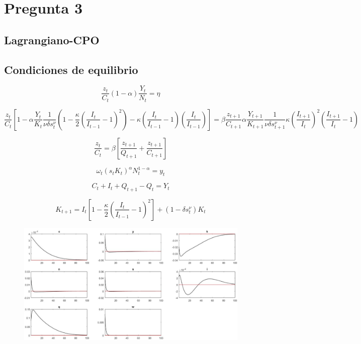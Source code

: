 \documentclass{article}
\begin{document}
\newpage
\section{Pregunta 3}
\subsection{Lagrangiano-CPO}
\subsection{Condiciones de equilibrio}
\begin{equation}
	 {\dfrac{z_t}{C_t}}(1-\alpha){\dfrac{Y_t}{N_t}}=\eta \nonumber
\end{equation}

\begin{equation}
	\dfrac{z_t}{C_t}[1-\alpha{\dfrac{Y_t}{K_t}}{\dfrac{1}{\nu\delta s_t^\nu}}(1-\dfrac{\kappa}{2}({\dfrac{I_t}{I_{t-1}}-1})^2)-\kappa(\dfrac{I_t}{I_{t-1}}-1)(\dfrac{I_t}{I_{t-1}})]=\beta{\dfrac{z_{t+1}}{C_{t+1}}}\alpha{\dfrac{Y_{t+1}}{K_{t+1}}}{\dfrac{1}{\nu\delta s_{t+1}^\nu}}\kappa({\dfrac{I_{t+1}}{I_{t}}})^2({\dfrac{I_{t+1}}{I_{t}}}-1) \nonumber
\end{equation}

\begin{equation}
	{\dfrac{z_t}{C_t}}=\beta[{\dfrac{z_{t+1}}{Q_{t+1}}}+{\dfrac{z_{t+1}}{C_{t+1}}}] \nonumber
\end{equation}






\begin{equation}
	\omega_{t}\left(s_{t} K_{t}\right)^{\alpha} N_{t}^{1-\alpha}=y_t \nonumber
\end{equation}

\begin{equation}
	C_t+I_t+Q_{t+1}-Q_t=Y_t \nonumber
\end{equation}

\begin{equation}
	K_{t+1}=I_t[1-\dfrac{\kappa}{2}({\dfrac{I_t}{I_{t-1}}-1})^2]+(1-\delta s_t^\nu)K_t \nonumber
\end{equation}


\newpage
\begin{figure}[h!]
	\centering
	\includegraphics[width=1.2\linewidth]{shockprefer}
	\label{fig:w3}
\end{figure}
\end{document}
